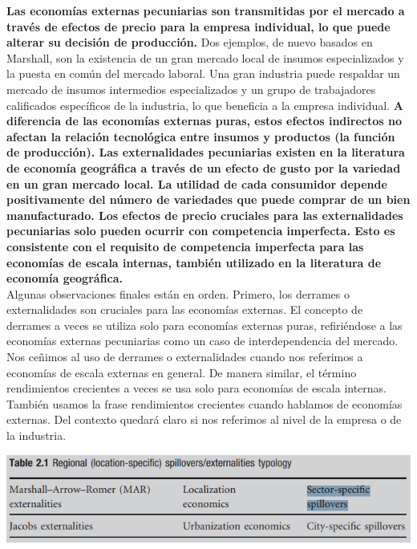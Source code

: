 \textbf{Las economías externas pecuniarias son transmitidas por el mercado a través de efectos de precio para la empresa individual, lo que puede alterar su decisión de producción.} Dos ejemplos, de nuevo basados en Marshall, son la existencia de un gran mercado local de insumos especializados y la puesta en común del mercado laboral. Una gran industria puede respaldar un mercado de insumos intermedios especializados y un grupo de trabajadores calificados específicos de la industria, lo que beneficia a la empresa individual. \textbf{A diferencia de las economías externas puras, estos efectos indirectos no afectan la relación tecnológica entre insumos y productos (la función de producción). Las externalidades pecuniarias existen en la literatura de economía geográfica a través de un efecto de gusto por la variedad en un gran mercado local. La utilidad de cada consumidor depende positivamente del número de variedades que puede comprar de un bien manufacturado. Los efectos de precio cruciales para las externalidades pecuniarias solo pueden ocurrir con competencia imperfecta. Esto es consistente con el requisito de competencia imperfecta para las economías de escala internas, también utilizado en la literatura de economía geográfica.}\\
Algunas observaciones finales están en orden. Primero, los derrames o externalidades son cruciales para las economías externas. El concepto de derrames a veces se utiliza solo para economías externas puras, refiriéndose a las economías externas pecuniarias como un caso de interdependencia del mercado. Nos ceñimos al uso de derrames o externalidades cuando nos referimos a economías de escala externas en general. De manera similar, el término rendimientos crecientes a veces se usa solo para economías de escala internas. También usamos la frase rendimientos crecientes cuando hablamos de economías externas. Del contexto quedará claro si nos referimos al nivel de la empresa o de la industria.\\

\begin{center}
    \includegraphics[scale=0.5]{imagen/imagen1.png}
\end{center}

